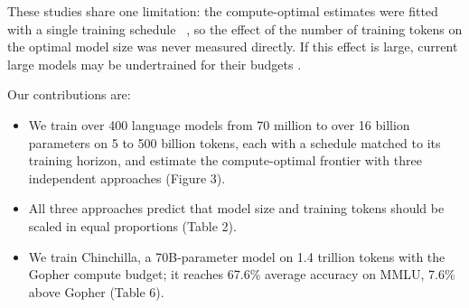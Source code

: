 These studies share one limitation: the compute-optimal estimates were fitted with a single training schedule ~\cite{kaplan2020}, so the effect of the number of training tokens on the optimal model size was never measured directly. If this effect is large, current large models may be undertrained for their budgets .

Our contributions are:

\begin{itemize}
\item We train over 400 language models from 70 million to over 16 billion parameters on 5 to 500 billion tokens, each with a schedule matched to its training horizon, and estimate the compute-optimal frontier with three independent approaches  (Figure 3).
\item All three approaches predict that model size and training tokens should be scaled in equal proportions  (Table 2).
\item We train Chinchilla, a 70B-parameter model on 1.4 trillion tokens with the Gopher compute budget; it reaches 67.6\% average accuracy on MMLU, 7.6\% above Gopher  (Table 6).
\end{itemize}
